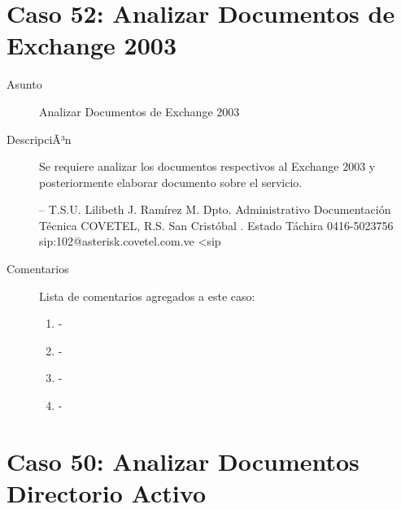 \section{Caso 52: Analizar Documentos de Exchange 2003 }

\begin{description}

\item[Asunto] Analizar Documentos de Exchange 2003\item[DescripciÃ³n] Se requiere analizar los documentos respectivos al Exchange 2003 y
posteriormente
elaborar documento sobre el servicio.

-- 
T.S.U. Lilibeth J. Ramírez M.
Dpto. Administrativo
Documentación Técnica
COVETEL, R.S.
San Cristóbal . Estado Táchira
0416-5023756
sip:102@asterisk.covetel.com.ve <sip%

\item[Comentarios] Lista de comentarios agregados a este caso:  
\begin{enumerate}
        \item {\bfseries  } - {\bfseries } \\         \item {\bfseries  } - {\bfseries } \\         \item {\bfseries  } - {\bfseries } \\         \item {\bfseries  } - {\bfseries } \\     \end{enumerate}

\end{description}

\section{Caso 50: Analizar Documentos Directorio Activo }

